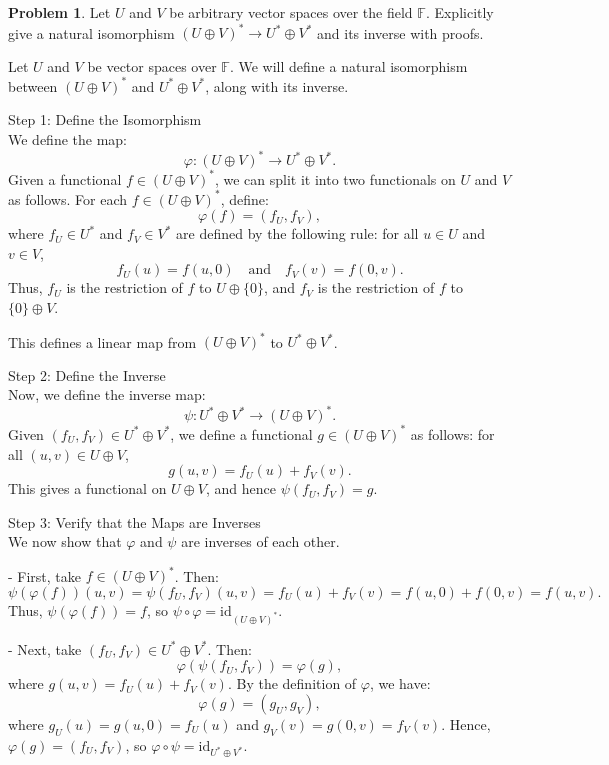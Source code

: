 \documentclass[12pt]{article}
\theoremstyle{definition}
\newtheorem{problem}{Problem}
\begin{document}
\begin{problem}
    Let $U$ and $V$ be arbitrary vector spaces over the field $\mathbb{F}$. Explicitly give a natural 
    isomorphism $(U \oplus V)^* \longrightarrow U^* \oplus V^*$ and its inverse with proofs.

    \begin{solution}
        Let $U$ and $V$ be vector spaces over $\mathbb{F}$. We will define a natural isomorphism between $(U \oplus V)^*$ and $U^* \oplus V^*$, along with its inverse.

        Step 1: Define the Isomorphism\\
        We define the map:
        \[
        \varphi: (U \oplus V)^* \to U^* \oplus V^*.
        \]
        Given a functional $f \in (U \oplus V)^*$, we can split it into two functionals on $U$ and $V$ as follows. For each $f \in (U \oplus V)^*$, define:
        \[
        \varphi(f) = (f_U, f_V),
        \]
        where $f_U \in U^*$ and $f_V \in V^*$ are defined by the following rule: for all $u \in U$ and $v \in V$, 
        \[
        f_U(u) = f(u, 0) \quad \text{and} \quad f_V(v) = f(0, v).
        \]
        Thus, $f_U$ is the restriction of $f$ to $U \oplus \{0\}$, and $f_V$ is the restriction of $f$ to $\{0\} \oplus V$.

        This defines a linear map from $(U \oplus V)^*$ to $U^* \oplus V^*$.

        Step 2: Define the Inverse\\
        Now, we define the inverse map:
        \[
        \psi: U^* \oplus V^* \to (U \oplus V)^*.
        \]
        Given $(f_U, f_V) \in U^* \oplus V^*$, we define a functional $g \in (U \oplus V)^*$ as follows: for all $(u, v) \in U \oplus V$,
        \[
        g(u, v) = f_U(u) + f_V(v).
        \]
        This gives a functional on $U \oplus V$, and hence $\psi(f_U, f_V) = g$.

        Step 3: Verify that the Maps are Inverses\\
        We now show that $\varphi$ and $\psi$ are inverses of each other.

        - First, take $f \in (U \oplus V)^*$. Then:
          \[
          \psi(\varphi(f))(u, v) = \psi(f_U, f_V)(u, v) = f_U(u) + f_V(v) = f(u, 0) + f(0, v) = f(u, v).
          \]
          Thus, $\psi(\varphi(f)) = f$, so $\psi \circ \varphi = \text{id}_{(U \oplus V)^*}$.

        - Next, take $(f_U, f_V) \in U^* \oplus V^*$. Then:
          \[
          \varphi(\psi(f_U, f_V)) = \varphi(g),
          \]
          where $g(u, v) = f_U(u) + f_V(v)$. By the definition of $\varphi$, we have:
          \[
          \varphi(g) = (g_U, g_V),
          \]
          where $g_U(u) = g(u, 0) = f_U(u)$ and $g_V(v) = g(0, v) = f_V(v)$. Hence, $\varphi(g) = (f_U, f_V)$, so $\varphi \circ \psi = \text{id}_{U^* \oplus V^*}$.


\end{solution}
\end{problem}
\end{document}
